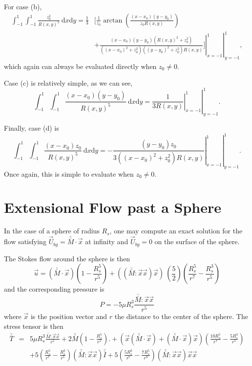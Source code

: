For case (b),
\begin{align}
\int_{-1}^1 \int_{-1}^1
\frac{ z_0^2     }{R(x,y)^5 }
\ \text{d}x \text{d}y
=
\frac{1}{3}
&\biggl[
\frac{1}{z_0}
\arctan \left(\frac{(x-x_0) (y-y_0)}{z_0 R(x,y)}\right)
\nonumber \\
& \left. \left. +\frac{(x-x_0) (y-y_0) \left(R(x,y)^2+ z_0^2\right)}{\left((x-x_0)^2+z_0^2\right) \left((y-y_0)^2+z_0^2\right) R(x,y)}
\biggr] \right|_{x=-1}^1 \right|_{y=-1}^1 ,
\label{eq_dlp_int_zz}
\end{align}
which again can always be evaluated directly when $z_0\neq0$.


Case (c) is relatively simple, as we can see, 
\begin{equation}
\int_{-1}^1 \int_{-1}^1
\frac{ (x-x_0)(y-y_0)    }{R(x,y)^5 }
\ \text{d}x \text{d}y
= \left. \left.
\frac{1}{3 R(x,y)} \right|_{x=-1}^1 \right|_{y=-1}^1 .
\label{eq_dlp_int_xy}
\end{equation}


Finally, case (d) is 
\begin{equation}
\int_{-1}^1 \int_{-1}^1
\frac{ (x-x_0)z_0    }{R(x,y)^5 }
\ \text{d}x \text{d}y
= \left. \left.
-\frac{(y-y_0) z_0}{3 \left((x-x_0)^2+z_0^2\right) R(x,y)} \right|_{x=-1}^1 \right|_{y=-1}^1.
\label{eq_dlp_int_xz}
\end{equation}
Once again, this is simple to evaluate when $z_0\neq0$.


\section{Extensional Flow past a Sphere}


In the case of a sphere of radius $R_s$, one may compute an exact solution for the flow satisfying $\vec{U}_{bg} = \bar{\bar{M}}\cdot \vec{x}$ at infinity and $\vec{U}_{bg} = 0$ on the surface of the sphere. 

The Stokes flow around the sphere is then \cite{guazzelli2012}
\[
\vec{u} = \left( \bar{\bar{M}} \cdot \vec{x} \right) \left( 1 - \frac{R_s^5}{r^5} \right) + \left( (\bar{\bar{M}} : \vec{x} \vec{x}) \vec{x} \right) \ \left( \frac{5}{2} \right)\left( \frac{R_s^5}{r^7}- \frac{R_s^3}{r^5} \right)
\]
and the corresponding pressure is
\[
P = - 5 \mu R_s^3  \frac{\bar{\bar{M}} : \vec{x}\vec{x}}{r^5}
\]
where $\vec{x}$ is the position vector and $r$ the distance to the center of the sphere. The stress tensor is then
\begin{eqnarray*}
\bar{\bar{T}} &=&  5 \mu R_s^3  \frac{\bar{\bar{M}} : \vec{x}\vec{x}}{r^5} + 2 \bar{\bar{M}} \left( 1 - \frac{R_s^5}{r^5} \right).+ ( \vec{x} (\bar{\bar{M}} \cdot \vec{x})  +  (\bar{\bar{M}} \cdot \vec{x}) \vec{x} ) \left( \frac{10R_s^5}{r^7} - \frac{5R_s^3}{r^5} \right)  \\
& & + 5 \left( \frac{R_s^5}{r^7}- \frac{R_s^3}{r^5} \right) (\bar{\bar{M}} : \vec{x}\vec{x}) \bar{\bar{I}} +  5 \left( \frac{5R_s^3}{r^7}- \frac{7R_s^5}{r^9} \right) (\bar{\bar{M}} : \vec{x}\vec{x}) \vec{x} \vec{x}
\end{eqnarray*}

